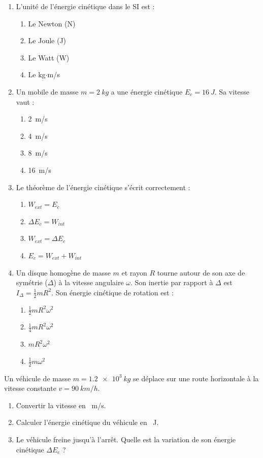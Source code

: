 \documentclass[11pt]{article}
\begin{document}
\begin{exercice}
\begin{enumerate}
    \item L'unité de l'énergie cinétique dans le SI est :
    \begin{enumerate}
        \item Le Newton (N)
        \item Le Joule (J)
        \item Le Watt (W)
        \item Le kg$\cdot$m/s
    \end{enumerate}
    \item Un mobile de masse $m = \SI{2}{kg}$ a une énergie cinétique $E_c = \SI{16}{J}$. Sa vitesse vaut :
    \begin{enumerate}
        \item \SI{2}{m/s}
        \item \SI{4}{m/s}
        \item \SI{8}{m/s}
        \item \SI{16}{m/s}
    \end{enumerate}
    \item Le théorème de l'énergie cinétique s'écrit correctement :
    \begin{enumerate}
        \item $W_{ext} = E_c$
        \item $\Delta E_c = W_{int}$
        \item $W_{ext} = \Delta E_c$
        \item $E_c = W_{ext} + W_{int}$
    \end{enumerate}
    \item Un disque homogène de masse $m$ et rayon $R$ tourne autour de son axe de symétrie ($\Delta$) à la vitesse angulaire $\omega$. Son inertie par rapport à $\Delta$ est $I_\Delta = \frac{1}{2}mR^2$. Son énergie cinétique de rotation est :
    \begin{enumerate}
        \item $\frac{1}{2}mR^2\omega^2$
        \item $\frac{1}{4}mR^2\omega^2$
        \item $mR^2\omega^2$
        \item $\frac{1}{2}m\omega^2$
    \end{enumerate}
\end{enumerate}
\end{exercice}

\begin{exercice}
Un véhicule de masse $m = \SI{1,2e3}{kg}$ se déplace sur une route horizontale à la vitesse constante $v = \SI{90}{km/h}$.
\begin{enumerate}
    \item Convertir la vitesse en \SI{}{m/s}.
    \item Calculer l'énergie cinétique du véhicule en \SI{}{J}.
    \item Le véhicule freine jusqu'à l'arrêt. Quelle est la variation de son énergie cinétique $\Delta E_c$ ?
\end{enumerate}
\end{exercice}
\end{document}
